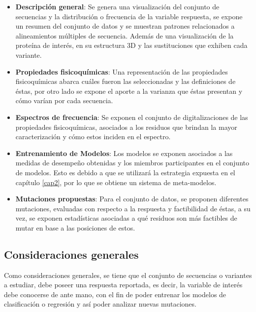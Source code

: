 \begin{itemize}
	
	\item \textbf{Descripción general}: Se genera una visualización del conjunto de secuencias y la distribución o frecuencia de la variable respuesta, se expone un resumen del conjunto de datos y se muestran patrones relacionados a alineamientos múltiples de secuencia. Además de una visualización de la proteína de interés, en su estructura 3D y las sustituciones que exhiben cada variante.
	
	\item \textbf{Propiedades fisicoquímicas}: Una representación de las propiedades fisicoquímicas abarca cuáles fueron las seleccionadas y las definiciones de éstas, por otro lado se expone el aporte a la varianza que éstas presentan y cómo varían por cada secuencia.
	
	\item \textbf{Espectros de frecuencia}: Se exponen el conjunto de digitalizaciones de las propiedades fisicoquímicas, asociados a los residuos que brindan la mayor caracterización y cómo estos inciden en el espectro.
	
	\item \textbf{Entrenamiento de Modelos}: Los modelos se exponen asociados a las medidas de desempeño obtenidas y los miembros participantes en el conjunto de modelos. Esto es debido a que se utilizará la estrategia expuesta en el capítulo \ref{cap2}, por lo que se obtiene un sistema de meta-modelos. 
	
	\item \textbf{Mutaciones propuestas}: Para el conjunto de datos, se proponen diferentes mutaciones, evaluadas con respecto a la respuesta y factibilidad de éstas, a su vez, se exponen estadísticas asociadas a qué residuos son más factibles de mutar en base a las posiciones de estos.
	
\end{itemize}


\subsection{Consideraciones generales}

Como consideraciones generales, se tiene que el conjunto de secuencias o variantes a estudiar, debe poseer una respuesta reportada, es decir, la variable de interés debe conocerse de ante mano, con el fin de poder entrenar los modelos de clasificación o regresión y así poder analizar nuevas mutaciones. 

